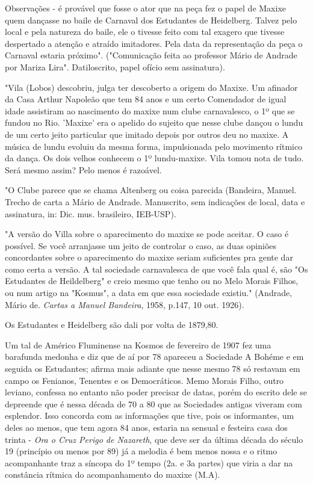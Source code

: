 Observações - é provável que fosse o ator que na peça fez o papel de
Maxixe quem dançasse no baile de Carnaval dos Estudantes de Heidelberg.
Talvez pelo local e pela natureza do baile, ele o tivesse feito com tal
exagero que tivesse despertado a atenção e atraído imitadores. Pela data
da representação da peça o Carnaval estaria próximo". ("Comunicação
feita ao professor Mário de Andrade por Mariza Lira". Datiloscrito,
papel ofício sem assinatura).

"Vila (Lobos) descobriu, julga ter descoberto a origem do Maxixe. Um
afinador da Casa Arthur Napoleão que tem 84 anos e um certo Comendador
de igual idade assistiram ao nascimento do maxixe num clube
carnavalesco, o 1º que se fundou no Rio. 'Maxixe' era o apelido do
sujeito que nesse clube dançou o lundu de um certo jeito particular que
imitado depois por outros deu no maxixe. A música de lundu evoluiu da
mesma forma, impulsionada pelo movimento rítmico da dança. Os dois
velhos conhecem o 1º lundu-maxixe. Vila tomou nota de tudo. Será mesmo
assim? Pelo menos é razoável.

"O Clube parece que se chama Altenberg ou coisa parecida (Bandeira,
Manuel. Trecho de carta a Mário de Andrade. Manuscrito, sem indicações
de local, data e assinatura, in: Dic. mus. brasileiro, IEB-USP).

"A versão do Villa sobre o aparecimento do maxixe se pode aceitar. O
caso é possível. Se você arranjasse um jeito de controlar o caso, as
duas opiniões concordantes sobre o aparecimento do maxixe seriam
suficientes pra gente dar como certa a versão. A tal sociedade
carnavalesca de que você fala qual é, são "Os Estudantes de Heildelberg"
e creio mesmo que tenho ou no Melo Morais Filhos, ou num artigo na
"Kosmus", a data em que essa sociedade existiu." (Andrade, Mário de.
\emph{Cartas a Manuel Bandeira}, 1958, p.147, 10 out. 1926).

Os Estudantes e Heidelberg são dali por volta de 1879,80.

Um tal de Américo Fluminense na Kosmos de fevereiro de 1907 fez uma
barafunda medonha e diz que de aí por 78 apareceu a Sociedade A Bohéme e
em seguida os Estudantes; afirma mais adiante que nesse mesmo 78 só
restavam em campo os Fenianos, Tenentes e os Democráticos. Memo Morais
Filho, outro leviano, confessa no entanto não poder precisar de datas,
porém do escrito dele se depreende que é nessa década de 70 a 80 que as
Sociedades antigas viveram com esplendor. Isso concorda com as
informações que tive, pois os informantes, um deles ao menos, que tem
agora 84 anos, estaria na sensual e festeira casa dos trinta - \emph{Ora
o Cruz Perigo de Nazareth}, que deve ser da última década do século 19
(princípio ou menos por 89) já a melodia é bem menos nossa e o ritmo
acompanhante traz a síncopa do 1º tempo (2a. e 3a partes) que viria a
dar na constância rítmica do acompanhamento do maxixe (M.A).


